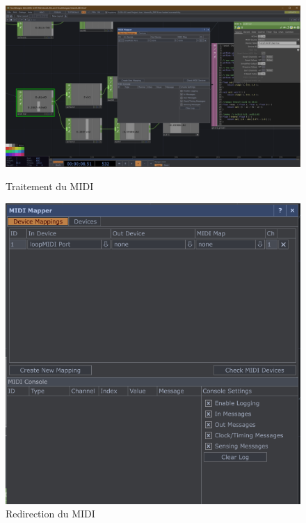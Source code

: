 \begin{figure}[h]
  \begin{minipage}[b]{0.45\linewidth}
    \centering
    \includegraphics[width=\linewidth]{images/experiments/intensifs/intensifs19.png} 
    \caption{Traitement du MIDI}
    \label{intensifs19}
  \end{minipage}
  \hspace{0.1\linewidth} %
  \begin{minipage}[b]{0.45\linewidth}
    \centering
    \includegraphics[width=\linewidth]{images/experiments/intensifs/intensifs20.png}
    \caption{Redirection du MIDI}
    \label{intensifs20}
  \end{minipage}
\end{figure}



